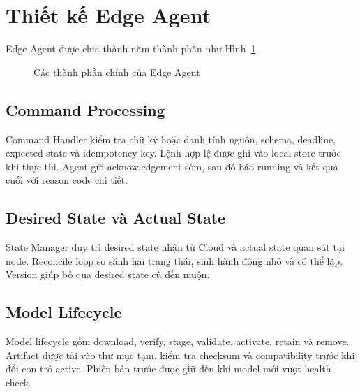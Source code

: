 \section{Thiết kế Edge Agent}

Edge Agent được chia thành năm thành phần như Hình~\ref{fig:edge-agent-components}.

\begin{figure}[H]
\centering
{}
\caption{Các thành phần chính của Edge Agent}
\label{fig:edge-agent-components}
\end{figure}

\subsection{Command Processing}

Command Handler kiểm tra chữ ký hoặc danh tính nguồn, schema, deadline,
expected state và idempotency key. Lệnh hợp lệ được ghi vào local store trước khi
thực thi. Agent gửi acknowledgement sớm, sau đó báo running và kết quả cuối với
reason code chi tiết.

\subsection{Desired State và Actual State}

State Manager duy trì desired state nhận từ Cloud và actual state quan sát tại
node. Reconcile loop so sánh hai trạng thái, sinh hành động nhỏ và có thể lặp.
Version giúp bỏ qua desired state cũ đến muộn.

\subsection{Model Lifecycle}

Model lifecycle gồm download, verify, stage, validate, activate, retain và remove.
Artifact được tải vào thư mục tạm, kiểm tra checksum và compatibility trước khi
đổi con trỏ active. Phiên bản trước được giữ đến khi model mới vượt health check.

